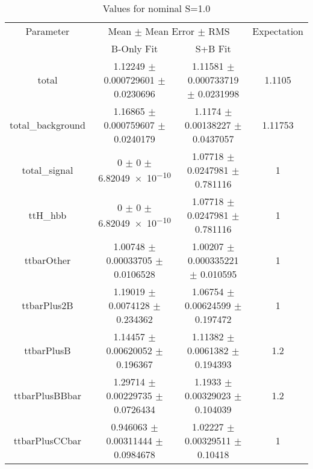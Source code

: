 \begin{table}
\centering
\caption{Values for nominal S=1.0}
\begin{tabular}{cccc}
\toprule
Parameter & \multicolumn{2}{c}{Mean $\pm$ Mean Error $\pm$ RMS} & Expectation\\
 & B-Only Fit & S+B Fit & \\
\midrule
total & \num{1.12249} $\pm$ \num{0.000729601} $\pm$ \num{0.0230696} & \num{1.11581} $\pm$ \num{0.000733719} $\pm$ \num{0.0231998} & \num{1.1105}\\
total\_background & \num{1.16865} $\pm$ \num{0.000759607} $\pm$ \num{0.0240179} & \num{1.1174} $\pm$ \num{0.00138227} $\pm$ \num{0.0437057} & \num{1.11753}\\
total\_signal & \num{0} $\pm$ \num{0} $\pm$ \num{6.82049e-10} & \num{1.07718} $\pm$ \num{0.0247981} $\pm$ \num{0.781116} & \num{1}\\
ttH\_hbb & \num{0} $\pm$ \num{0} $\pm$ \num{6.82049e-10} & \num{1.07718} $\pm$ \num{0.0247981} $\pm$ \num{0.781116} & \num{1}\\
ttbarOther & \num{1.00748} $\pm$ \num{0.00033705} $\pm$ \num{0.0106528} & \num{1.00207} $\pm$ \num{0.000335221} $\pm$ \num{0.010595} & \num{1}\\
ttbarPlus2B & \num{1.19019} $\pm$ \num{0.0074128} $\pm$ \num{0.234362} & \num{1.06754} $\pm$ \num{0.00624599} $\pm$ \num{0.197472} & \num{1}\\
ttbarPlusB & \num{1.14457} $\pm$ \num{0.00620052} $\pm$ \num{0.196367} & \num{1.11382} $\pm$ \num{0.0061382} $\pm$ \num{0.194393} & \num{1.2}\\
ttbarPlusBBbar & \num{1.29714} $\pm$ \num{0.00229735} $\pm$ \num{0.0726434} & \num{1.1933} $\pm$ \num{0.00329023} $\pm$ \num{0.104039} & \num{1.2}\\
ttbarPlusCCbar & \num{0.946063} $\pm$ \num{0.00311444} $\pm$ \num{0.0984678} & \num{1.02227} $\pm$ \num{0.00329511} $\pm$ \num{0.10418} & \num{1}\\
\bottomrule
\end{tabular}
\end{table}